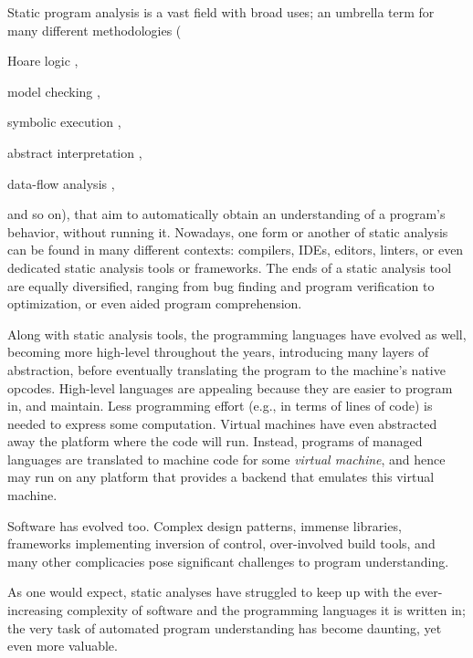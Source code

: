 Static program analysis is a vast field with broad uses; an umbrella
term for many different methodologies (%
\begin{inparablank}
  \item Hoare logic
    \cite{journals/cacm/Hoare69,floyd1967assigning,lics:2002/Reynolds,csl/OHearnRY01},
  \item model checking
    \cite{icalp/EmersonC80,lop/ClarkeE81,toplas/ClarkeES86,programm/QueilleS82},
  \item symbolic execution
    \cite{journals/cacm/King76,journals/tse/Howden77,conf/kbse/PasareanuR10,Boyer:1975:SFS:390016.808445},
  \item abstract interpretation
    \cite{popl/CousotC77,journals/jlp/CousotC92,journals/logcom/CousotC92},
  \item data-flow analysis
    \cite{popl/Kildall73,books/daglib/0030999,books/mk/Muchnick1997,journals/acta/KamU77,popl/RepsHS95,books/ph/SharirP81},
\end{inparablank}
and so on), that aim to automatically obtain an
understanding of a program's behavior, without running it. Nowadays,
one form or another of static analysis can be found in many different
contexts: compilers, IDEs, editors, linters, or even dedicated static
analysis tools or frameworks. The ends of a static analysis tool are
equally diversified, ranging from bug finding and program
verification to optimization, or even aided program comprehension.

Along with static analysis tools, the programming languages have
evolved as well, becoming more high-level throughout the years,
introducing many layers of abstraction, before eventually translating
the program to the machine's native opcodes. High-level languages are
appealing because they are easier to program in, and maintain. Less
programming effort (e.g., in terms of lines of code) is needed to
express some computation. Virtual machines have even abstracted away
the platform where the code will run. Instead, programs of managed
languages are translated to machine code for some \emph{virtual
  machine}, and hence may run on any platform that provides a backend
that emulates this virtual machine.

Software has evolved too. Complex design patterns, immense libraries,
frameworks implementing inversion of control, over-involved build
tools, and many other complicacies pose significant challenges to
program understanding.

As one would expect, static analyses have struggled to keep up with
the ever-increasing complexity of software and the programming
languages it is written in; the very task of automated program
understanding has become daunting, yet even more valuable.

